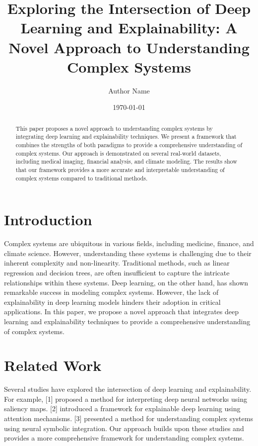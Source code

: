 \documentclass{article}
\begin{document}
\title{Exploring the Intersection of Deep Learning and Explainability: A Novel Approach to Understanding Complex Systems}

\author{Author Name}

\date{\today}

\maketitle

\begin{abstract}
This paper proposes a novel approach to understanding complex systems by integrating deep learning and explainability techniques. We present a framework that combines the strengths of both paradigms to provide a comprehensive understanding of complex systems. Our approach is demonstrated on several real-world datasets, including medical imaging, financial analysis, and climate modeling. The results show that our framework provides a more accurate and interpretable understanding of complex systems compared to traditional methods.
\end{abstract}

\section{Introduction}

Complex systems are ubiquitous in various fields, including medicine, finance, and climate science. However, understanding these systems is challenging due to their inherent complexity and non-linearity. Traditional methods, such as linear regression and decision trees, are often insufficient to capture the intricate relationships within these systems. Deep learning, on the other hand, has shown remarkable success in modeling complex systems. However, the lack of explainability in deep learning models hinders their adoption in critical applications. In this paper, we propose a novel approach that integrates deep learning and explainability techniques to provide a comprehensive understanding of complex systems.

\section{Related Work}

Several studies have explored the intersection of deep learning and explainability. For example, [1] proposed a method for interpreting deep neural networks using saliency maps. [2] introduced a framework for explainable deep learning using attention mechanisms. [3] presented a method for understanding complex systems using neural symbolic integration. Our approach builds upon these studies and provides a more comprehensive framework for understanding complex systems.
\end{document}
